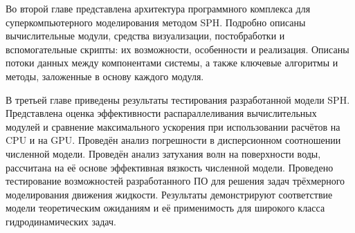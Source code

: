 Во второй главе представлена архитектура программного комплекса для суперкомпьютерного моделирования методом SPH.
%
Подробно описаны вычислительные модули, средства визуализации, постобработки и вспомогательные скрипты:
их возможности, особенности и реализация.
%
Описаны потоки данных между компонентами системы, а также ключевые алгоритмы и методы, заложенные в основу каждого модуля.


В третьей главе приведены результаты тестирования разработанной модели SPH.
%
Представлена оценка эффективности распараллеливания вычислительных модулей и
сравнение максимального ускорения при использовании расчётов на CPU и на GPU.
%
Проведён анализ погрешности в дисперсионном соотношении численной модели.
%
Проведён анализ затухания волн на поверхности воды, рассчитана на её основе эффективная вязкость численной модели.
%
Проведено тестирование возможностей разработанного ПО для решения задач трёхмерного моделирования движения жидкости.
%
Результаты демонстрируют соответствие модели теоретическим ожиданиям и 
её применимость для широкого класса гидродинамических задач.


